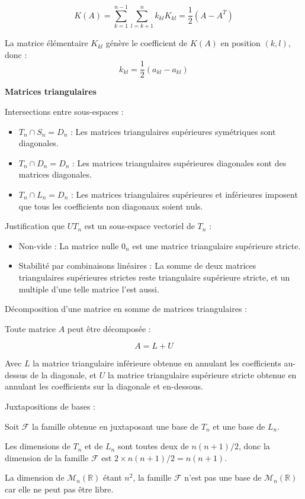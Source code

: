 \documentclass[10pt,a4paper]{article}
\begin{document}
$$ K(A) = \sum_{k=1}^{n-1} \sum_{l=k+1}^n k_{kl} K_{kl} = \frac{1}{2} (A - A^T) $$

La matrice élémentaire $K_{kl}$ génère le coefficient de $K(A)$ en position $(k,l)$, donc :
$$k_{kl} = \frac{1}{2} (a_{kl} - a_{kl})$$


\bigskip
\textbf{Matrices triangulaires}

\q Intersections entre sous-espaces :

\begin{itemize}
    \item $T_n \cap S_n = D_n$ : Les matrices triangulaires supérieures symétriques sont diagonales.
    \item $T_n \cap D_n = D_n$ : Les matrices triangulaires supérieures diagonales sont des matrices
    diagonales.
    \item $T_n \cap L_n = D_n$ : Les matrices triangulaires supérieures et inférieures imposent que
    tous les coefficients non diagonaux soient nuls.
\end{itemize}

\q Justification que $UT_n$ est un sous-espace vectoriel de $T_n$ :
\begin{itemize}
    \item Non-vide : La matrice nulle $0_n$ est une matrice triangulaire supérieure stricte.
    \item Stabilité par combinaisons linéaires : La somme de deux matrices triangulaires supérieures
    strictes reste triangulaire supérieure stricte, et un multiple d'une telle matrice l'est aussi.
\end{itemize}

\q Décomposition d'une matrice en somme de matrices triangulaires :

Toute matrice $A$ peut être décomposée :

$$ A = L + U $$

Avec $ L $ la matrice triangulaire inférieure obtenue en annulant les coefficients au-dessus de la
diagonale, et $ U $ la matrice triangulaire supérieure stricte obtenue en annulant les coefficients
sur la diagonale et en-dessous.

\q Juxtapositions de bases :

Soit $\mathcal{F}$ la famille obtenue en juxtaposant une base de $T_n$ et une base de $L_n$.

Les dimensions de $T_n$ et de $L_n$ sont toutes deux de $n(n+1)/2$, donc la dimension de la famille
$\mathcal{F}$ est $2 \times n(n+1)/2 = n(n+1)$.

La dimension de $\mathcal{M}_n(\mathbb{R})$ étant $n^2$, la famille $\mathcal{F}$ n'est pas une base
de $\mathcal{M}_n(\mathbb{R})$ car elle ne peut pas être libre.
\end{document}
